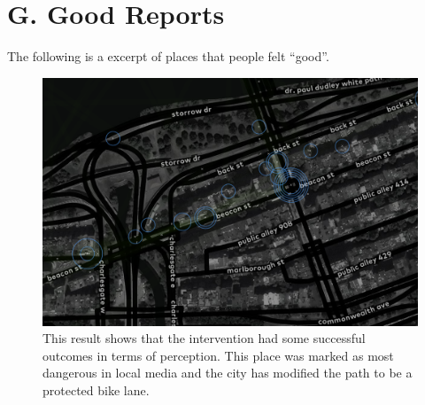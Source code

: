 \chapter{G. Good Reports}

The following is a excerpt of places that people felt ``good''.

\begin{figure}[!htb]
  \includegraphics{appendix/G/fig/good_beacon.png}               
  \caption[``good'' reports in Massachusetts avenue and Beacon Street]{This result shows that the intervention had some successful outcomes in terms of perception. This place was marked as most dangerous in local media and the city has modified the path to be a protected bike lane. }
  \label{fig:good_beacon}
\end{figure}

